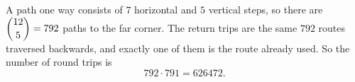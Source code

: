 A path one way consists of $7$ horizontal and $5$ vertical steps, so there are $\dbinom{12}{5}=792$ paths to the far corner. The return trips are the same $792$ routes traversed backwards, and exactly one of them is the route already used. So the number of round trips is
\[792\cdot791=\boxed{626472}.\]
